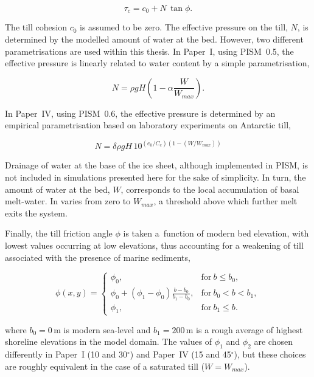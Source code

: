 \documentclass{article}
\begin{document}
\begin{equation}
   \tau_c = c_0 + N\,\tan{\phi}.
\end{equation}

The till cohesion $c_0$ is assumed to be zero. The effective pressure on the
till, $N$, is determined by the modelled amount of water at the bed. However,
two different parametrisations are used within this thesis. In Paper~I, using
PISM~0.5, the effective pressure is linearly related to water content by a
simple parametrisation,

\begin{equation}
    N = \rho gH (1 - \alpha \frac{W}{W_{max}}).
\end{equation}

In Paper~IV, using PISM~0.6, the effective pressure is determined by an
empirical parametrisation based on laboratory experiments on Antarctic till,

\begin{equation}
    N = \delta \rho gH \, 10^{(e_0/C_c) (1 - (W/W_{max}))}
\end{equation}

Drainage of water at the base of the ice sheet, although implemented in PISM,
is not included in simulations presented here for the sake of simplicity.
In turn, the amount of water at the bed, $W$, corresponds to the local
accumulation of basal melt-water. In varies from zero to $W_{max}$, a threshold
above which further melt exits the system.

Finally, the till friction angle $\phi$ is taken a~function of modern bed
elevation, with lowest values occurring at low elevations, thus accounting for
a weakening of till associated with the presence of marine sediments,

\begin{equation}
  \phi(x,y) =
  \begin{cases}
    \phi_0, & \mathrm{for}\ b \le b_0, \\
    \phi_0 + (\phi_1-\phi_0) \frac{b - b_0}{b_1-b_0},
        & \mathrm{for}\ b_0 < b < b_1, \\
    \phi_1, & \mathrm{for}\ b_1 \le b.
  \end{cases}
  \label{eq:phipiecewise}
\end{equation}

where $b_0=0$\,m is modern sea-level and $b_1=200$\,m is a rough average of
highest shoreline elevations in the model domain. The values of $\phi_1$ and
$\phi_2$ are chosen differently in Paper~I (10 and 30$^\circ$) and Paper~IV
(15 and 45$^\circ$), but these choices are roughly equivalent in the case of a
saturated till ($W=W_{max}$).
\end{document}
